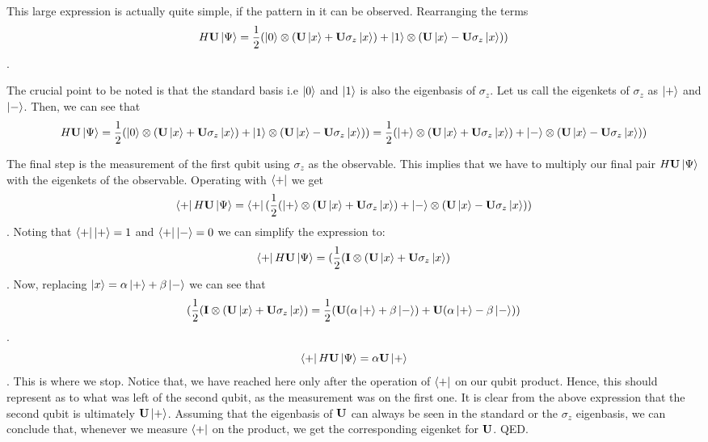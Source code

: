 This large expression is actually quite simple, if the pattern in it can be observed. Rearranging the terms
$$H \mathbf{U}\left| \Psi \right> = \frac{1}{2}(\left| 0 \right> \otimes(\mathbf{U}\left| x \right>+\mathbf{U}\sigma_{z}\left| x \right>) + \left| 1 \right> \otimes(\mathbf{U}\left| x \right>-\mathbf{U}\sigma_{z}\left| x \right>))$$.

The crucial point to be noted is that the standard basis i.e $ \left| 0 \right>$ and $\left| 1 \right>$ is also the eigenbasis of $\sigma_{z}$. Let us call the eigenkets of $\sigma_{z}$ as $\left| + \right>$ and $\left| - \right>$. Then, we can see that $$H \mathbf{U}\left| \Psi \right> = \frac{1}{2}(\left| 0 \right> \otimes(\mathbf{U}\left| x \right>+\mathbf{U}\sigma_{z}\left| x \right>) + \left| 1 \right> \otimes(\mathbf{U}\left| x \right>-\mathbf{U}\sigma_{z}\left| x \right>)) = \frac{1}{2}(\left| + \right> \otimes(\mathbf{U}\left| x \right>+\mathbf{U}\sigma_{z}\left| x \right>) + \left| - \right> \otimes(\mathbf{U}\left| x \right>-\mathbf{U}\sigma_{z}\left| x \right>))$$

The final step is the measurement of the first qubit using $\sigma_{z}$ as the observable. This implies that we have to multiply our final pair $H \mathbf{U}\left| \Psi \right>$ with the eigenkets of the observable. Operating with $\left< + \right|$  we get $$\left< + \right|H\mathbf{U}\left| \Psi \right> = \left< + \right|(\frac{1}{2}(\left| + \right> \otimes(\mathbf{U}\left| x \right>+\mathbf{U}\sigma_{z}\left| x \right>) + \left| - \right> \otimes(\mathbf{U}\left| x \right>-\mathbf{U}\sigma_{z}\left| x \right>))$$. Noting that $\left< + \right|\left| + \right> = 1$ and $\left< + \right|\left| - \right> = 0$ we can simplify the expression to: $$\left< + \right|H\mathbf{U}\left| \Psi \right> = (\frac{1}{2}( \mathbf{I} \otimes(\mathbf{U}\left| x \right>+\mathbf{U}\sigma_{z}\left| x \right>) $$. Now, replacing $\left| x \right> = \alpha\left| + \right> + \beta\left| - \right>$ we can see that $$(\frac{1}{2}( \mathbf{I} \otimes(\mathbf{U}\left| x \right>+\mathbf{U}\sigma_{z}\left| x \right>) = \frac{1}{2}(\mathbf{U}(\alpha\left| + \right> + \beta\left| - \right>)+\mathbf{U}(\alpha\left| + \right> - \beta\left| - \right>))$$.
$$\left< + \right|H\mathbf{U}\left| \Psi \right> = \alpha\mathbf{U}\left| + \right>$$. This is where we stop. Notice that, we have reached here only after the operation of $\left< + \right|$ on our qubit product. Hence, this should represent as to what was left of the second qubit, as the measurement was on the first one. It is clear from the above expression that the second qubit is ultimately $\mathbf{U}\left| + \right>$. Assuming that the eigenbasis of $\mathbf{U}$ can always be seen in the standard or the $\sigma_{z}$ eigenbasis, we can conclude that, whenever we measure $\left< + \right|$ on the product, we get the corresponding eigenket for $\mathbf{U}$. QED.
